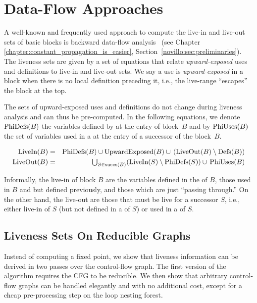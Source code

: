 \section{Data-Flow Approaches}
\label{sec:data-flow}

A well-known and frequently used approach to compute the live-in and live-out sets of basic blocks is backward data-flow analysis~ (see Chapter \ref{chapter:constant_propagation_is_easier}, Section~\ref{novillo:sec:preliminaries}).
The liveness sets are given by a set of equations that relate \emph{upward-exposed} uses and definitions to live-in and live-out sets.
We say a use is \emph{upward-exposed} in a block when there is no local definition preceding it, i.e., the live-range ``escapes'' the block at the top.

The sets of upward-exposed uses and definitions do not change during liveness analysis and can thus be pre-computed.
%
In the following equations, we denote $\textrm{PhiDefs}(B)$ the variables defined by \phifuns at the entry of block~$B$ and by $\textrm{PhiUses}(B)$ the set of variables used in a \phifun at the entry of a successor of the block~$B$.

\begin{eqnarray*}
	\textrm{LiveIn}(B) & = & \textrm{PhiDefs}(B) \cup \textrm{UpwardExposed}(B) \cup \,(\textrm{LiveOut}(B)\setminus \textrm{Defs}(B)) \\
	\textrm{LiveOut}(B)& = &
	\textstyle \bigcup_{S \in \textrm{succs}(B)} (\textrm{LiveIn}(S) \setminus
	\textrm{PhiDefs}(S)) \cup\, \textrm{PhiUses}(B)
\end{eqnarray*}

Informally, the live-in of block $B$ are the variables defined in the \phifuns of $B$, those used in $B$ and but defined previously, and those which are just ``passing through.'' On the other hand, the live-out are those that must be live for a successor $S$, i.e., either live-in of $S$ (but not defined in a \phifun of $S$) or used in a \phifun of $S$.


\subsection{Liveness Sets On Reducible Graphs}
\label{sec:forreducible}

Instead of computing a fixed point, we show that liveness information can be derived in two passes over the control-flow graph.
The first version of the algorithm requires the CFG to be reducible.
We then show that arbitrary control-flow graphs can be handled elegantly and with no additional cost, except for a cheap pre-processing step on the loop nesting forest.

